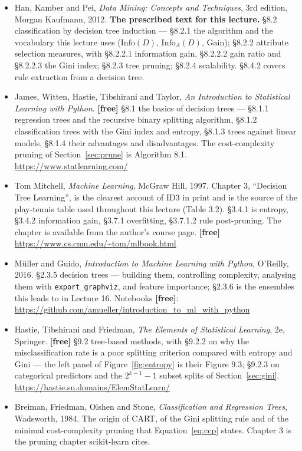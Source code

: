 \documentclass[11pt]{article}
\begin{document}
\begin{itemize}[leftmargin=*]
  \item Han, Kamber and Pei, \emph{Data Mining: Concepts and Techniques}, 3rd
    edition, Morgan Kaufmann, 2012. \textbf{The prescribed text for this
    lecture.} \S8.2 classification by decision tree induction --- \S8.2.1 the
    algorithm and the vocabulary this lecture uses ($\mathrm{Info}(D)$,
    $\mathrm{Info}_A(D)$, $\mathrm{Gain}$); \S8.2.2 attribute selection
    measures, with \S8.2.2.1 information gain, \S8.2.2.2 gain ratio and
    \S8.2.2.3 the Gini index; \S8.2.3 tree pruning; \S8.2.4 scalability.
    \S8.4.2 covers rule extraction from a decision tree.
  \item James, Witten, Hastie, Tibshirani and Taylor, \emph{An Introduction to
    Statistical Learning with Python}. \textbf{[free]} \S8.1 the basics of
    decision trees --- \S8.1.1 regression trees and the recursive binary
    splitting algorithm, \S8.1.2 classification trees with the Gini index and
    entropy, \S8.1.3 trees against linear models, \S8.1.4 their advantages and
    disadvantages. The cost-complexity pruning of Section~\ref{sec:prune} is
    Algorithm 8.1.
    \url{https://www.statlearning.com/}
  \item Tom Mitchell, \emph{Machine Learning}, McGraw Hill, 1997. Chapter 3,
    ``Decision Tree Learning'', is the clearest account of ID3 in print and is
    the source of the play-tennis table used throughout this lecture
    (Table 3.2). \S3.4.1 is entropy, \S3.4.2 information gain, \S3.7.1
    overfitting, \S3.7.1.2 rule post-pruning. The chapter is available from
    the author's course page. \textbf{[free]}
    \url{https://www.cs.cmu.edu/~tom/mlbook.html}
  \item M\"uller and Guido, \emph{Introduction to Machine Learning with
    Python}, O'Reilly, 2016. \S2.3.5 decision trees --- building them,
    controlling complexity, analysing them with \texttt{export\_graphviz}, and
    feature importance; \S2.3.6 is the ensembles this leads to in Lecture 16.
    Notebooks \textbf{[free]}:
    \url{https://github.com/amueller/introduction_to_ml_with_python}
  \item Hastie, Tibshirani and Friedman, \emph{The Elements of Statistical
    Learning}, 2e, Springer. \textbf{[free]} \S9.2 tree-based methods, with
    \S9.2.2 on why the misclassification rate is a poor splitting criterion
    compared with entropy and Gini --- the left panel of
    Figure~\ref{fig:entropy} is their Figure 9.3; \S9.2.3 on categorical
    predictors and the $2^{k-1}-1$ subset splits of Section~\ref{sec:gini}.
    \url{https://hastie.su.domains/ElemStatLearn/}
  \item Breiman, Friedman, Olshen and Stone, \emph{Classification and
    Regression Trees}, Wadsworth, 1984. The origin of CART, of the Gini
    splitting rule and of the minimal cost-complexity pruning that
    Equation~\eqref{eq:ccp} states. Chapter 3 is the pruning chapter
    scikit-learn cites.
\end{itemize}
\end{document}
